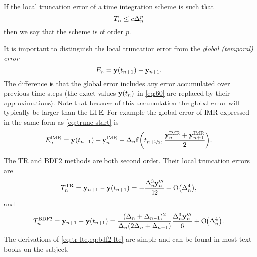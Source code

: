 If the local truncation error of a time integration scheme is such that 
\begin{equation}
  T_n \leq c \Delta_{n}^p
\end{equation}
then we say that the scheme is of order $p$.

It is important to distinguish the local truncation error from the \emph{global (temporal) error}
\begin{equation}
  \label{eq:global-temporal-error}
    E_n = \mathbf{y}(t_{n+1}) - \mathbf{y}_{n+1}.
\end{equation}
The difference is that the global error includes any error accumulated over previous time steps (\ie the exact values $\mathbf{y}(t_n)$ in \cref{eq:60} are replaced by their approximations).
Note that because of this accumulation the global error will typically be larger than the LTE.
For example the global error of IMR expressed in the same form as \cref{eq:trunc-start} is
\begin{equation}
  E_n^{\text{IMR}} =  \mathbf{y}(t_{n+1}) - \mathbf{y}_n^{\text{IMR}} - \Delta_{n} {\mathbf{f}{\left(  t_{n+\nicefrac{1}{2}}, \frac{\mathbf{y}_n^{\text{IMR}} + \mathbf{y}_{n+1}^{\text{IMR}}}{2}  \right)}}.
\end{equation}

The TR and BDF2 methods are both second order.
Their local truncation errors are \cite[261]{GreshoSani}
\begin{equation}
  \label{eq:tr-lte}
  T_n^{\text{TR}} = \mathbf{y}_{n+1} - \mathbf{y}(t_{n+1}) = -\frac{\Delta_{n}^3 \mathbf{y}_n'''}{12}
  + \text{O}{\left( \Delta_{n}^4 \right)},
\end{equation}
and \cite[715]{GreshoSani}
\begin{equation}
  \label{eq:bdf2-lte}
  T_n^{\text{BDF2}} = \mathbf{y}_{n+1} - \mathbf{y}(t_{n+1}) = \frac{(\Delta_{n} + \Delta_{n-1})^2}{\Delta_{n}(2\Delta_{n} + \Delta_{n-1})}
  \frac{\Delta_{n}^3 \mathbf{y}_n'''}{6}
  + \text{O}{\left( \Delta_{n}^4 \right)}.
\end{equation}
The derivations of \cref{eq:tr-lte,eq:bdf2-lte} are simple and can be found in most text books on the subject.

